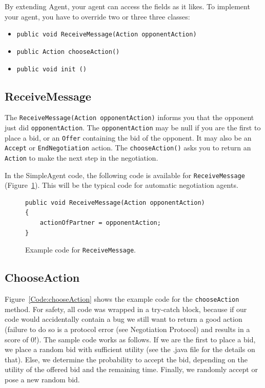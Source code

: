 \documentclass[]{article}
\begin{document}
{By extending Agent, your agent can access the fields as it likes.  
To implement your agent, you have to override two or three three classes:

\begin{itemize}
	\item \texttt{public void ReceiveMessage(Action opponentAction)}
	\item \texttt{public Action chooseAction()}
	\item \texttt{public void init ()}
\end{itemize}

\subsection{ReceiveMessage}
The \texttt{ReceiveMessage(Action opponentAction)} informs you that the opponent just did \texttt{opponentAction}. The \texttt{opponentAction} may be null if you are the first to place a bid, or an \texttt{Offer} containing the bid of the opponent. It may also be an \texttt{Accept} or \texttt{EndNegotiation} action.
The \texttt{chooseAction()} asks you to return an \texttt{Action} to make the next step in the negotiation.

In the SimpleAgent code, the following code is available for \texttt{ReceiveMessage} (Figure~\ref{Code:ReceiveMessage}). This will be the typical code for automatic negotiation agents.

\begin{figure}[htb]
\begin{lstlisting}
public void ReceiveMessage(Action opponentAction) 
{
	actionOfPartner = opponentAction;
}
\end{lstlisting}
\caption{Example code for \texttt{ReceiveMessage}.}\label{Code:ReceiveMessage}
\end{figure}

\subsection{ChooseAction}
Figure~\ref{Code:chooseAction} shows the example code for the \texttt{chooseAction} method. For safety, all code was wrapped in a try-catch block, because if our code would accidentally contain a bug we still want to return a good action (failure to do so is a protocol error (see Negotiation Protocol) and results in a score of 0!).
The sample code works as follows. If we are the first to place a bid, we place a random bid with sufficient utility (see the .java file for the details on that). Else, we determine the probability to accept the bid, depending on the utility of the offered bid and the remaining time. Finally, we randomly accept or pose a new random bid.

}
\end{document}

